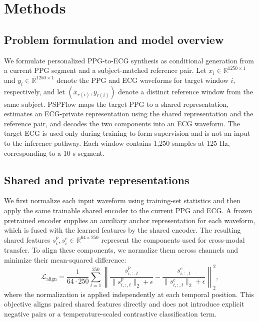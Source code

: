 \section{Methods}
\label{sec:methods}

\subsection{Problem formulation and model overview}
\label{sec:problem}
We formulate personalized PPG-to-ECG synthesis as conditional generation from a current PPG segment and a subject-matched reference pair. Let $x_i\in\mathbb{R}^{1250\times1}$ and $y_i\in\mathbb{R}^{1250\times1}$ denote the PPG and ECG waveforms for target window $i$, respectively, and let $(x_{r(i)},y_{r(i)})$ denote a distinct reference window from the same subject. PSPFlow maps the target PPG to a shared representation, estimates an ECG-private representation using the shared representation and the reference pair, and decodes the two components into an ECG waveform. The target ECG is used only during training to form supervision and is not an input to the inference pathway. Each window contains 1,250 samples at 125 Hz, corresponding to a 10-s segment.

\subsection{Shared and private representations}
\label{sec:representations}
We first normalize each input waveform using training-set statistics and then apply the same trainable shared encoder to the current PPG and ECG. A frozen pretrained encoder supplies an auxiliary anchor representation for each waveform, which is fused with the learned features by the shared encoder. The resulting shared features $s_i^{p},s_i^{e}\in\mathbb{R}^{64\times250}$ represent the components used for cross-modal transfer. To align these components, we normalize them across channels and minimize their mean-squared difference:
\begin{equation}
\mathcal{L}_{\mathrm{align}}
= \frac{1}{64\cdot250}\sum_{t=1}^{250}
\left\|
\frac{s_{i,:,t}^{p}}{\|s_{i,:,t}^{p}\|_2+\epsilon}
-
\frac{s_{i,:,t}^{e}}{\|s_{i,:,t}^{e}\|_2+\epsilon}
\right\|_2^2,
\label{eq:alignment}
\end{equation}
where the normalization is applied independently at each temporal position. This objective aligns paired shared features directly and does not introduce explicit negative pairs or a temperature-scaled contrastive classification term.

